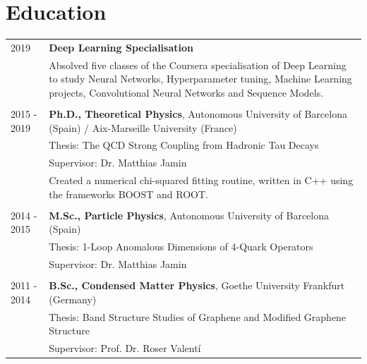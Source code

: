 \documentclass[11pt]{article}
\begin{document}
\begin{tabularx}{\textwidth}{lX}
\end{tabularx}


\section*{Education}
\begin{tabularx}{\textwidth}{lX}
  2019         & \textbf{Deep Learning Specialisation} \\
               & Absolved five classes of the Coursera specialisation of Deep Learning to study Neural Networks,
                 Hyperparameter tuning, Machine Learning projects, Convolutional Neural Networks and Sequence Models. \\\\
  2015 - 2019  & \textbf{Ph.D., Theoretical Physics}, Autonomous University of
                 Barcelona (Spain) / Aix-Marseille University (France) \\
               & Thesis: The QCD Strong Coupling from Hadronic Tau
                 Decays \\
               & Supervisor: Dr. Matthias Jamin \\
               & Created a numerical chi-squared fitting routine, written in
                 C++ using the frameworks BOOST and ROOT. \\\\
  2014 - 2015  & \textbf{M.Sc., Particle Physics}, Autonomous University of
                                Barcelona (Spain) \\
               & Thesis: 1-Loop Anomalous Dimensions of 4-Quark
                 Operators \\
               & Supervisor: Dr. Matthias Jamin \\\\
  2011 - 2014  & \textbf{B.Sc., Condensed Matter Physics}, Goethe University Frankfurt (Germany) \\
               & Thesis: Band Structure Studies of Graphene and Modified
                 Graphene Structure \\
               & Supervisor: Prof. Dr. Roser Valentí
\end{tabularx}
		
\end{document}
